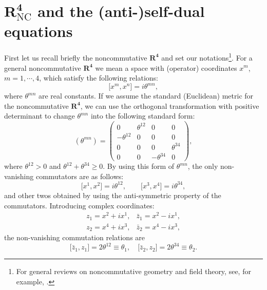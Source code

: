 \documentclass[a4paper,a4paper]{article}
\begin{document}
\section{$\mathbf{{R}_{\mathrm{NC}}^{4}}$ and the (anti-)self-dual equations}

First let us recall briefly the noncommutative $\mathbf{{R}^{4}}$ and set
our notations\footnote{%
For general reviews on noncommutative geometry and field theory, see, for
example, \cite{Paperc, Reviewa, Reviewb, Reviewc}.}. For a general
noncommutative $\mathbf{{R}^{4}}$ we mean a space with (operator)
coordinates $x^{m}$, $m=1,\cdots ,4$, which satisfy the following relations:
\begin{equation}
\lbrack x^{m},x^{n}]=i\theta ^{mn},
\end{equation}%
where $\theta ^{mn}$ are real constants. If we assume the standard
(Euclidean) metric for the noncommutative $\mathbf{{R}^{4}}$, we can use the
orthogonal transformation with positive determinant to change $\theta ^{mn}$
into the following standard form:
\begin{equation}
(\theta ^{mn})=\left(
\begin{array}{cccc}
0 & \theta ^{12} & 0 & 0 \\
-\theta ^{12} & 0 & 0 & 0 \\
0 & 0 & 0 & \theta ^{34} \\
0 & 0 & -\theta ^{34} & 0%
\end{array}%
\right) ,  \label{theta}
\end{equation}%
where $\theta ^{12}>0$ and $\theta ^{12}+\theta ^{34}\geq 0$. By using this
form of $\theta ^{mn}$, the only non-vanishing commutators are as follows:
\begin{equation}
\lbrack x^{1},x^{2}]=i\theta ^{12},\qquad \lbrack x^{3},x^{4}]=i\theta ^{34},
\end{equation}%
and other twos obtained by using the anti-symmetric property of the
commutators. Introducing complex coordinates:
\begin{equation}
\begin{array}{rl}
z_{1}=x^{2}+ix^{1}, & \bar{z}_{1}=x^{2}-ix^{1}, \\
z_{2}=x^{4}+ix^{3}, & \bar{z}_{2}=x^{4}-ix^{3},%
\end{array}
\label{complex}
\end{equation}%
the non-vanishing commutation relations are
\begin{equation}
\lbrack \bar{z}_{1},z_{1}]=2\theta ^{12}\equiv \theta _{1},\quad \lbrack
\bar{z}_{2},z_{2}]=2\theta ^{34}\equiv \theta _{2}.  \label{z commutator}
\end{equation}
\end{document}
